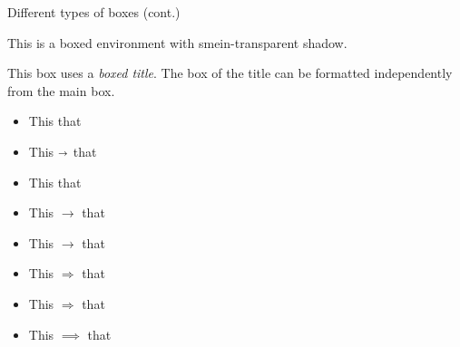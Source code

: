 \documentclass{beamer}
\begin{document}

\begin{frame}{Different types of boxes (cont.)}
\begin{shadowblock}
 This is a boxed environment with smein-transparent shadow.
\end{shadowblock}

\begin{tcolorbox}[enhanced,attach boxed title to top center={yshift=-3mm,yshifttext=-1mm},
  colback=blue!5!white,colframe=blue!75!black,colbacktitle=red!80!black,
  title=New title,fonttitle=\bfseries,
  boxed title style={size=small,colframe=red!50!black} ]
  This box uses a \textit{boxed title}. The box of the title can be formatted independently from the main box.
\end{tcolorbox}

\begin{tcolorbox}[enhanced,fit to height=5cm,
  colback=green!25!black!10!white,colframe=green!75!black,title=Fit box (5cm),
  drop fuzzy shadow,watermark color=white,watermark text=Fit]
  \lipsum[1-4]
\end{tcolorbox}
\end{frame}


\begin{frame}
        \begin{itemize}
            \item This \MVRightarrow{} that
            \item This $\shortrightarrow$ that
            \item This \textrightarrow{} that
            \item This $\rightarrow$ that
            \item This $\longrightarrow$ that
        \end{itemize}
        
        \begin{itemize}
    \item This $\Rightarrow$ that
    \item This $\Longrightarrow$ that
    \item This $\implies$ that
\end{itemize}
    \end{frame}
    
\end{document}
